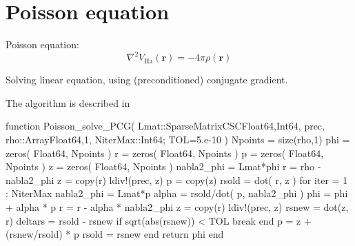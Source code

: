 \section{Poisson equation}

Poisson equation:
\begin{equation}
\nabla^2 V_{\mathrm{Ha}}(\mathbf{r}) = -4\pi\rho(\mathbf{r})
\end{equation}

Solving linear equation, using (preconditioned) conjugate gradient.

The algorithm is described in 

\begin{juliacode}
function Poisson_solve_PCG( Lmat::SparseMatrixCSC{Float64,Int64},
                            prec,
                            rho::Array{Float64,1}, NiterMax::Int64;
                            TOL=5.e-10 )
    Npoints = size(rho,1)
    phi = zeros( Float64, Npoints )
    r = zeros( Float64, Npoints )
    p = zeros( Float64, Npoints )
    z = zeros( Float64, Npoints )
    nabla2_phi = Lmat*phi
    r = rho - nabla2_phi
    z = copy(r)
    ldiv!(prec, z)
    p = copy(z)
    rsold = dot( r, z )
    for iter = 1 : NiterMax
        nabla2_phi = Lmat*p
        alpha = rsold/dot( p, nabla2_phi )
        phi = phi + alpha * p
        r = r - alpha * nabla2_phi
        z = copy(r)
        ldiv!(prec, z)
        rsnew = dot(z, r)
        deltars = rsold - rsnew
        if sqrt(abs(rsnew)) < TOL
            break
        end
        p = z + (rsnew/rsold) * p
        rsold = rsnew
    end
    return phi
end
\end{juliacode}

